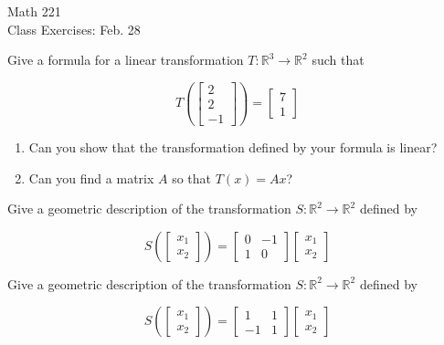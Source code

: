 \documentclass[11pt]{article}
\begin{document}
\begin{center}
\Large
\rm{Math 221}
\\
\rm{Class Exercises:  Feb. 28}
\\
\end{center}
\vspace{0.2in}

Give a formula for a linear transformation $T:\mathbb{R}^3\to\mathbb{R}^2$ such that

\begin{displaymath}
T\left(\left[ \begin{array}{r} 2 \\ 2 \\ -1 \end{array}\right]\right) = 
\left[ \begin{array}{r} 7 \\ 1 \end{array}\right]
\end{displaymath}

\begin{enumerate}
	\item {Can you show that the transformation defined by your formula is linear?}
	\item {Can you find a matrix $A$ so that $T(x)=Ax$?}
\end{enumerate}

\pagebreak

Give a geometric description of the transformation $S:\mathbb{R}^2\to\mathbb{R}^2$ defined by

\begin{displaymath}
S\left(\left[ \begin{array}{r} x_1 \\ x_2 \end{array}\right]\right) = 
\left[ \begin{array}{rr} 0 & -1 \\ 1 & 0 \end{array}\right]
\left[ \begin{array}{r} x_1 \\ x_2 \end{array}\right]
\end{displaymath}


\vspace{4in}

Give a geometric description of the transformation $S:\mathbb{R}^2\to\mathbb{R}^2$ defined by

\begin{displaymath}
S\left(\left[ \begin{array}{r} x_1 \\ x_2 \end{array}\right]\right) = 
\left[ \begin{array}{rr} 1 & 1 \\ -1 & 1 \end{array}\right]
\left[ \begin{array}{r} x_1 \\ x_2 \end{array}\right]
\end{displaymath}
\end{document}
